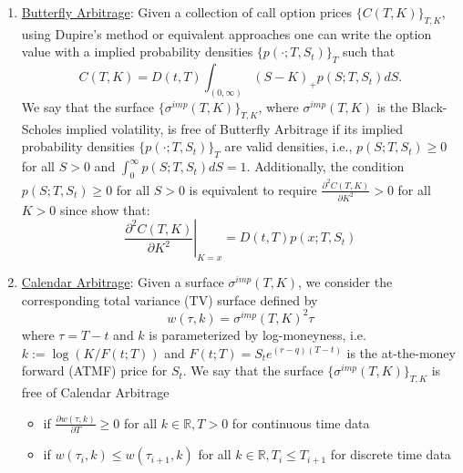 \documentclass[letterpaper,12pt,titlepage,oneside,final]{book}
\numberwithin{equation}{section}
\theoremstyle{definition}
\begin{document}
\begin{enumerate}
\item  \label{item:butterfly}\underline{Butterfly Arbitrage}: Given a collection of call option prices $\{C(T,K)\}_{T,K}$, using Dupire's method or equivalent approaches \cite{dupire1994pricing} one can write the option value with  a implied probability densities $\{ p(\cdot;T,S_t) \}_{T}$ such that 
\[
C(T,K) = D(t,T) \int_{(0,\infty)} (S - K)_+ p(S;T,S_t) dS.
\]
We say that the surface $\{ \sigma^{imp}(T,K) \}_{T,K}$, where $\sigma^{imp}(T,K)$ is the Black-Scholes implied volatility, is free of Butterfly Arbitrage if its implied probability densities $\{p(\cdot ; T,S_t)\}_{T}$ are valid densities, i.e., $p(S;T,S_t) \geq 0$ for all $S > 0$ and $\int_{0}^{\infty} p(S;T,S_t) dS = 1$. 
Additionally, the condition $p(S;T,S_t) \geq 0$ for all $S > 0$ is equivalent to require $\frac{\partial^2 C(T,K)}{\partial K^2} > 0$ for all $K > 0$ since 
\citet{breeden1978prices} show that:
\[
	\left. \frac{\partial^2 C(T,K)}{\partial K^2} \right\vert_{K=x}=D(t,T)	p(x;T,S_t)
\]


\item \label{item:calendar} \underline{Calendar Arbitrage}:
 Given a surface $\sigma^{imp}(T,K)$, we consider the corresponding total variance (TV) surface defined by 
 \[
 w(\tau,k) = \sigma^{imp}(T,K)^2 \tau
 \]
 where $\tau =T-t$ and $k$ is parameterized by log-moneyness, i.e. $k := \log(K/F(t;T))$ and $F(t;T)=S_te^{(r-q)(T-t)}$ is the at-the-money forward (ATMF) price for $S_t$. 
We say that the surface $\{ \sigma^{imp}(T,K) \}_{T,K}$ is free of Calendar Arbitrage 
\begin{itemize}
\item if $\frac{\partial w(\tau,k)}{\partial T} \geq 0 $ for all $k \in \mathbb{R}, T > 0$ for continuous time data
\item if $w(\tau_i,k) \leq w(\tau_{i+1},k)$ for all $k \in \mathbb{R},  T_{i} \leq T_{i+1}$ for discrete time data 
\end{itemize}


\end{enumerate}
\end{document}
